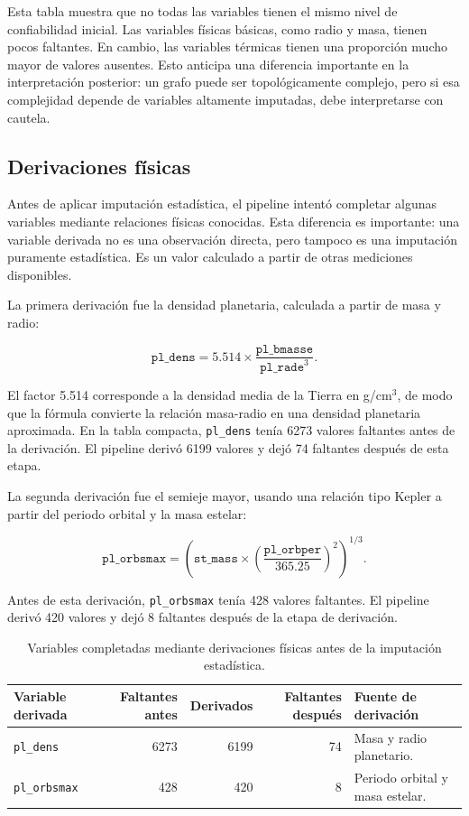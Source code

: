 Esta tabla muestra que no todas las variables tienen el mismo nivel de confiabilidad inicial. Las variables físicas básicas, como radio y masa, tienen pocos faltantes. En cambio, las variables térmicas tienen una proporción mucho mayor de valores ausentes. Esto anticipa una diferencia importante en la interpretación posterior: un grafo puede ser topológicamente complejo, pero si esa complejidad depende de variables altamente imputadas, debe interpretarse con cautela.

\subsection*{Derivaciones físicas}

Antes de aplicar imputación estadística, el pipeline intentó completar algunas variables mediante relaciones físicas conocidas. Esta diferencia es importante: una variable derivada no es una observación directa, pero tampoco es una imputación puramente estadística. Es un valor calculado a partir de otras mediciones disponibles.

La primera derivación fue la densidad planetaria, calculada a partir de masa y radio:

\[
\texttt{pl\_dens}
=
5.514
\times
\frac{\texttt{pl\_bmasse}}{\texttt{pl\_rade}^{3}}.
\]

El factor 5.514 corresponde a la densidad media de la Tierra en g/cm$^3$, de modo que la fórmula convierte la relación masa-radio en una densidad planetaria aproximada. En la tabla compacta, \texttt{pl\_dens} tenía 6273 valores faltantes antes de la derivación. El pipeline derivó 6199 valores y dejó 74 faltantes después de esta etapa.

La segunda derivación fue el semieje mayor, usando una relación tipo Kepler a partir del periodo orbital y la masa estelar:

\[
\texttt{pl\_orbsmax}
=
\left(
\texttt{st\_mass}
\times
\left(
\frac{\texttt{pl\_orbper}}{365.25}
\right)^2
\right)^{1/3}.
\]

Antes de esta derivación, \texttt{pl\_orbsmax} tenía 428 valores faltantes. El pipeline derivó 420 valores y dejó 8 faltantes después de la etapa de derivación.

\begin{table}[H]
\centering
\small
\begin{tabular}{lrrrp{}}
\toprule
\textbf{Variable derivada} & \textbf{Faltantes antes} & \textbf{Derivados} & \textbf{Faltantes después} & \textbf{Fuente de derivación} \\
\midrule
\texttt{pl\_dens} & 6273 & 6199 & 74 & Masa y radio planetario. \\
\texttt{pl\_orbsmax} & 428 & 420 & 8 & Periodo orbital y masa estelar. \\
\bottomrule
\end{tabular}
\caption{Variables completadas mediante derivaciones físicas antes de la imputación estadística.}
\label{tab:physical_derivations}
\end{table}

